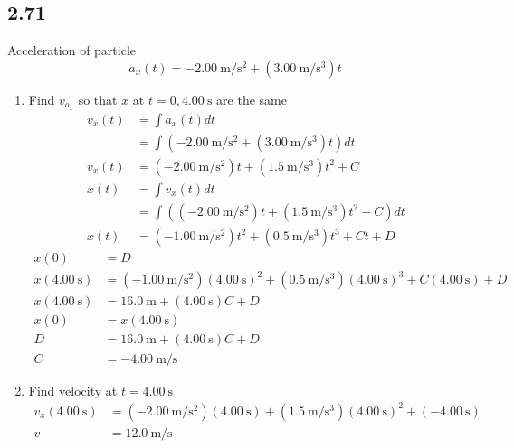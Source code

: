 \documentclass{article}
\begin{document}
\subsection{2.71}
Acceleration of particle
$$ a_x(t) = \SI{-2.00}{\meter \per \second \squared} + (\SI{3.00}{\meter \per \second \cubed})t $$
\begin{enumerate}[label=\textbf{(\alph*)}]
	\item
		Find $ v_{o_x} $ so that $ x $ at $ t = 0, \SI{4.00}{\second} $ are the same
		\begin{align*}
			v_x(t) & = \int a_x(t) dt \\
				   & = \int \left( \SI{-2.00}{\meter \per \second \squared} + (\SI{3.00}{\meter \per \second \cubed})t \right) dt \\
			v_x(t) & = (\SI{-2.00}{\meter \per \second \squared})t + (\SI{1.5}{\meter \per \second \cubed})t^2 + C \\
			x(t) & = \int v_x(t) dt \\
				 & = \int \left( (\SI{-2.00}{\meter \per \second \squared})t + (\SI{1.5}{\meter \per \second \cubed})t^2 + C \right) dt \\
			x(t) & = (\SI{-1.00}{\meter \per \second \squared})t^2 + (\SI{0.5}{\meter \per \second \cubed})t^3 + Ct + D
		\end{align*}
		\begin{align*}
			x(0) & = D \\
			x(\SI{4.00}{\second}) & = (\SI{-1.00}{\meter \per \second \squared})(\SI{4.00}{\second})^2 + (\SI{0.5}{\meter \per \second \cubed})(\SI{4.00}{\second})^3 + C(\SI{4.00}{\second}) + D \\
			x(\SI{4.00}{\second}) & = \SI{16.0}{\meter} + (\SI{4.00}{\second})C + D \\
			x(0) & = x(\SI{4.00}{\second}) \\
			D & = \SI{16.0}{\meter} + (\SI{4.00}{\second})C + D \\
			C & = \SI{-4.00}{\meter \per \second}
		\end{align*}
	\item
		Find velocity at $ t = \SI{4.00}{\second} $
		\begin{align*}
			v_x(\SI{4.00}{\second}) & = (\SI{-2.00}{\meter \per \second \squared})(\SI{4.00}{\second}) + (\SI{1.5}{\meter \per \second \cubed})(\SI{4.00}{\second})^2 + (\SI{-4.00}{\second}) \\
			v & = \SI{12.0}{\meter \per \second}
		\end{align*}
\end{enumerate}
\end{document}
